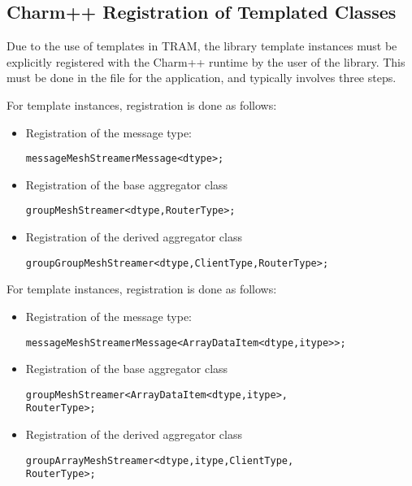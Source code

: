 \subsection{Charm++ Registration of Templated Classes}

Due to the use of templates in TRAM, the library template instances must be
explicitly registered with the Charm++ runtime by the user of the library. This
must be done in the  file for the application, and typically involves
three steps.

For  template instances, registration is done as
follows:
\begin{itemize}
\item{Registration of the message type:}
\begin{alltt}
message MeshStreamerMessage<dtype>;
\end{alltt}
\item{Registration of the base aggregator class}
\begin{alltt}
group MeshStreamer<dtype, RouterType>;
\end{alltt}
\item{Registration of the derived aggregator class}
\begin{alltt}
group GroupMeshStreamer<dtype, ClientType, RouterType>;
\end{alltt}
\end{itemize}

For  template instances, registration is done as
follows:
\begin{itemize}
\item{Registration of the message type:}
\begin{alltt}
message MeshStreamerMessage<ArrayDataItem<dtype, itype> >;
\end{alltt}
\item{Registration of the base aggregator class}
\begin{alltt}
group MeshStreamer<ArrayDataItem<dtype, itype>,
                   RouterType>;
\end{alltt}
\item{Registration of the derived aggregator class}
\begin{alltt}
group ArrayMeshStreamer<dtype, itype, ClientType,
                        RouterType>;
\end{alltt}
\end{itemize}


